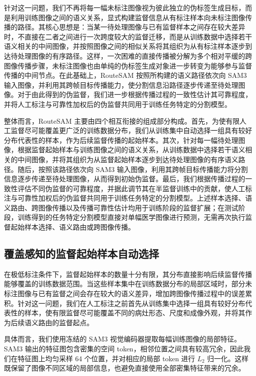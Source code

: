 \documentclass[UTF8,a4paper,10pt,twocolumn]{ctexart}
\begin{document}
针对这一问题，我们不再将每一幅未标注图像视为彼此独立的伪标签生成目标，而是利用训练图像之间的语义关系，显式构建监督信息从有标注样本向未标注图像传播的路径。其核心思想是：当某一待处理图像与已有监督样本之间存在较大差异时，不直接在二者之间进行一次跨度较大的监督迁移，而是从训练数据中选择若干语义相关的中间图像，并按照图像之间的相似关系将其组织为从有标注样本逐步到达待处理图像的有序路径。这样，一次困难的直接传播被分解为多个相对平缓的跨图像传播步骤，未标注图像也由单纯的伪标签生成对象进一步转变为能够参与监督传播的中间节点。在此基础上，RouteSAM 按照所构建的语义路径依次向 SAM3 输入图像，并利用其跨帧目标传播能力，使分割信息沿路径逐步传递至待处理图像。对于由此得到的伪监督，我们进一步根据传播过程的一致性估计其可靠程度，并将人工标注与可靠性加权后的伪监督共同用于训练任务特定的分割模型。


整体而言，RouteSAM 主要由四个相互衔接的组成部分构成。首先，为使有限人工监督尽可能覆盖更广泛的训练数据分布，我们从训练集中自动选择一组具有较好分布代表性的样本，作为后续监督传播的起始样本。其次，针对每一幅待处理图像，根据监督起始样本与训练图像之间的语义关系，从训练数据中选择若干语义相关的中间图像，并将其组织为从监督起始样本逐步到达待处理图像的有序语义路径。随后，按照该路径依次向 SAM3 输入图像，利用其跨帧目标传播能力将分割信息逐步传递至待处理图像，从而得到初始伪监督。最后，我们根据传播过程的一致性评估不同伪监督的可靠程度，并据此调节其在半监督训练中的贡献，使人工标注与可靠性加权后的伪监督共同用于训练任务特定的分割模型。上述样本选择、语义路由、跨图像传播以及传播可靠性估计均用于训练阶段的监督扩展；在测试阶段，训练得到的任务特定分割模型直接对单幅医学图像进行预测，无需再次执行监督起始样本选择、语义路由或跨图像传播。








\subsection{覆盖感知的监督起始样本自动选择}
\label{sec:support-selection}

在极低标注条件下，监督起始样本的数量十分有限，其分布直接影响后续监督传播能够覆盖的训练数据范围。当这些样本集中在训练数据分布的局部区域时，部分未标注图像与已有监督之间会存在较大的语义差异，增加跨图像传播过程中的误差累积。针对这一问题，我们在人工标注之前首先从训练集中选择一组具有较好分布代表性的样本，使有限监督尽可能覆盖不同的病灶形态、尺度和成像外观，并将其作为后续语义路由的监督起点。

具体而言，我们使用冻结的 SAM3 视觉编码器提取每幅训练图像的局部特征。SAM3 输出的特征图包含密集的空间 token，相邻位置之间具有较高冗余，因此我们在特征图上均匀采样 64 个位置，并对相应的局部 token 进行 $L_2$ 归一化。这样既保留了图像不同区域的局部信息，也避免直接使用全部密集特征带来的冗余。
\end{document}

